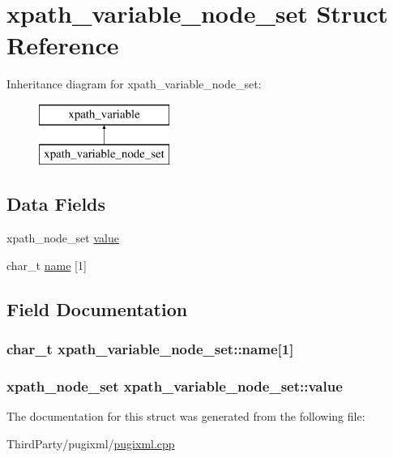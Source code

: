 \hypertarget{structxpath__variable__node__set}{\section{xpath\-\_\-variable\-\_\-node\-\_\-set Struct Reference}
\label{structxpath__variable__node__set}
}
Inheritance diagram for xpath\-\_\-variable\-\_\-node\-\_\-set\-:\begin{figure}[H]
\begin{center}
\leavevmode
\includegraphics[height=2.000000cm]{structxpath__variable__node__set}
\end{center}
\end{figure}
\subsection*{Data Fields}
\begin{DoxyCompactItemize}
\item 
xpath\-\_\-node\-\_\-set \hyperlink{structxpath__variable__node__set_a830ac0dbcaf5f8ff3373d10273e72bf4}{value}
\item 
char\-\_\-t \hyperlink{structxpath__variable__node__set_a9a6a40cea40764364adb3ddba2e7a2ff}{name} \mbox{[}1\mbox{]}
\end{DoxyCompactItemize}


\subsection{Field Documentation}
\hypertarget{structxpath__variable__node__set_a9a6a40cea40764364adb3ddba2e7a2ff}{
\subsubsection[{name}]{\setlength{\rightskip}{0pt plus 5cm}char\-\_\-t xpath\-\_\-variable\-\_\-node\-\_\-set\-::name\mbox{[}1\mbox{]}}}\label{structxpath__variable__node__set_a9a6a40cea40764364adb3ddba2e7a2ff}
\hypertarget{structxpath__variable__node__set_a830ac0dbcaf5f8ff3373d10273e72bf4}{
\subsubsection[{value}]{\setlength{\rightskip}{0pt plus 5cm}xpath\-\_\-node\-\_\-set xpath\-\_\-variable\-\_\-node\-\_\-set\-::value}}\label{structxpath__variable__node__set_a830ac0dbcaf5f8ff3373d10273e72bf4}


The documentation for this struct was generated from the following file\-:\begin{DoxyCompactItemize}
\item 
Third\-Party/pugixml/\hyperlink{pugixml_8cpp}{pugixml.\-cpp}\end{DoxyCompactItemize}
